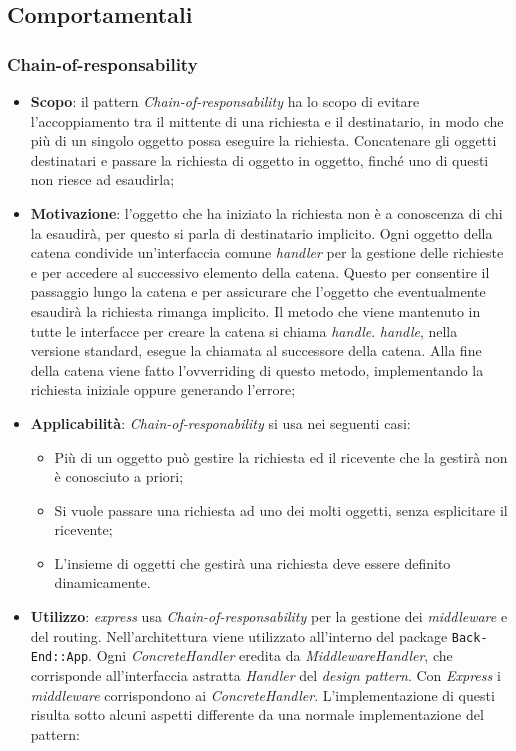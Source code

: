 \subsection{Comportamentali}
\subsubsection{Chain-of-responsability}
\begin{itemize}
\item \textbf{Scopo}: il pattern \textit{Chain-of-responsability} ha lo scopo di evitare l'accoppiamento tra il mittente di una richiesta e il destinatario, in modo che più di un singolo oggetto possa eseguire la richiesta. Concatenare gli oggetti destinatari e passare la richiesta di oggetto in oggetto, finché uno di questi non riesce ad esaudirla;
\item \textbf{Motivazione}: l'oggetto che ha iniziato la richiesta non è a conoscenza di chi la esaudirà, per questo si parla di destinatario implicito. Ogni oggetto della catena condivide un'interfaccia comune \textit{handler} per la gestione delle richieste e per accedere al successivo elemento della catena. Questo per consentire il passaggio lungo la catena e per assicurare che l'oggetto che eventualmente esaudirà la richiesta rimanga implicito. Il metodo che viene mantenuto in tutte le interfacce per creare la catena si chiama \textit{handle}. \textit{handle}, nella versione standard, esegue la chiamata al successore della catena. Alla fine della catena viene fatto l'ovverriding di questo metodo, implementando la richiesta iniziale oppure generando l'errore;
\item \textbf{Applicabilità}: \textit{Chain-of-responability} si usa nei seguenti casi:
	\begin{itemize}
		\item Più di un oggetto può gestire la richiesta ed il ricevente che la gestirà non è conosciuto a priori;
		\item Si vuole passare una richiesta ad uno dei molti oggetti, senza esplicitare il ricevente;
		\item L'insieme di oggetti che gestirà una richiesta deve essere definito dinamicamente.
	\end{itemize}
\item \textbf{Utilizzo}: \textit{express} usa \textit{Chain-of-responsability} per la gestione dei \textit{middleware} e del routing. Nell'architettura viene utilizzato all'interno del package \texttt{Back-End::App}. Ogni \textit{ConcreteHandler} eredita da \textit{MiddlewareHandler}, che corrisponde all'interfaccia astratta \textit{Handler} del \textit{design pattern}. Con \textit{Express} i \textit{middleware} corrispondono ai \textit{ConcreteHandler}. L'implementazione di questi risulta sotto alcuni aspetti differente da una normale implementazione del pattern:

\end{itemize}
